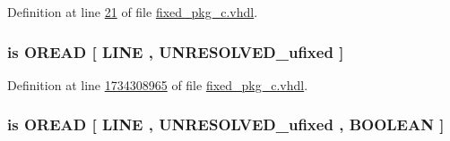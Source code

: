 Definition at line \hyperlink{fixed__pkg__c_8vhdl_source_l00021}{21} of file \hyperlink{fixed__pkg__c_8vhdl_source}{fixed\+\_\+pkg\+\_\+c.\+vhdl}.

\hypertarget{classfixed__pkg_a21cb230b741789466e4808f91a4be180}{}
\subsubsection[{O\+C\+T\+A\+L\+\_\+\+R\+E\+A\+D}]{ {\bfseries \textcolor{keywordflow}{is}\textcolor{vhdlchar}{ }\textcolor{vhdlchar}{O\+R\+E\+A\+D}\textcolor{vhdlchar}{ }\textcolor{vhdlchar}{\mbox{[}}\textcolor{vhdlchar}{ }\textcolor{vhdlchar}{L\+I\+N\+E}\textcolor{vhdlchar}{ }\textcolor{vhdlchar}{,}\textcolor{vhdlchar}{ }{\bfseries {\bf U\+N\+R\+E\+S\+O\+L\+V\+E\+D\+\_\+ufixed}} \textcolor{vhdlchar}{ }\textcolor{vhdlchar}{\mbox{]}}\textcolor{vhdlchar}{ }} \hspace{0.3cm}{\ttfamily [Alias]}}\label{classfixed__pkg_a21cb230b741789466e4808f91a4be180}


Definition at line \hyperlink{fixed__pkg__c_8vhdl_source_l1734308965}{1734308965} of file \hyperlink{fixed__pkg__c_8vhdl_source}{fixed\+\_\+pkg\+\_\+c.\+vhdl}.

\hypertarget{classfixed__pkg_a5d11047f49ec5274897efe747f6e82e2}{}
\subsubsection[{O\+C\+T\+A\+L\+\_\+\+R\+E\+A\+D}]{ {\bfseries \textcolor{keywordflow}{is}\textcolor{vhdlchar}{ }\textcolor{vhdlchar}{O\+R\+E\+A\+D}\textcolor{vhdlchar}{ }\textcolor{vhdlchar}{\mbox{[}}\textcolor{vhdlchar}{ }\textcolor{vhdlchar}{L\+I\+N\+E}\textcolor{vhdlchar}{ }\textcolor{vhdlchar}{,}\textcolor{vhdlchar}{ }{\bfseries {\bf U\+N\+R\+E\+S\+O\+L\+V\+E\+D\+\_\+ufixed}} \textcolor{vhdlchar}{ }\textcolor{vhdlchar}{,}\textcolor{vhdlchar}{ }\textcolor{comment}{B\+O\+O\+L\+E\+A\+N}\textcolor{vhdlchar}{ }\textcolor{vhdlchar}{\mbox{]}}\textcolor{vhdlchar}{ }} \hspace{0.3cm}{\ttfamily [Alias]}}\label{classfixed__pkg_a5d11047f49ec5274897efe747f6e82e2}


